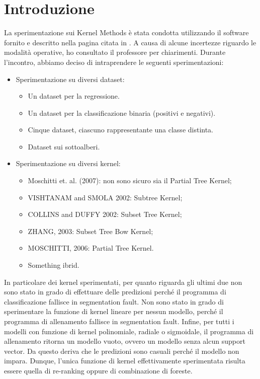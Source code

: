\section{Introduzione}

La sperimentazione sui Kernel Methods è stata condotta utilizzando il software 
fornito e descritto nella pagina citata in \cite{kernel}. A causa di alcune 
incertezze riguardo le modalità operative, ho consultato il professore per 
chiarimenti. Durante l'incontro, abbiamo deciso di intraprendere le seguenti 
sperimentazioni:

\begin{itemize}
    \item Sperimentazione su diversi dataset:
    \begin{itemize}
        \item Un dataset per la regressione.
        \item Un dataset per la classificazione binaria (positivi e negativi).
        \item Cinque dataset, ciascuno rappresentante una classe distinta.
        \item Dataset sui sottoalberi.
    \end{itemize}
\item Sperimentazione su diversi kernel:
    \begin{itemize}
        \item Moschitti et. al. (2007): non sono sicuro sia il Partial Tree
            Kernel;

        \item VISHTANAM and SMOLA 2002: Subtree Kernel;

        \item COLLINS and DUFFY 2002: Subset Tree Kernel;

        \item ZHANG, 2003: Subset Tree Bow Kernel;

        \item MOSCHITTI, 2006: Partial Tree Kernel.

        \item Something ibrid.
    \end{itemize}
\end{itemize}

In particolare dei kernel sperimentati, per quanto riguarda gli ultimi due non 
sono stato in grado di effettuare delle predizioni perché il programma di 
classificazione fallisce in segmentation fault. 
Non sono stato in grado di sperimentare la funzione
di kernel lineare per nessun modello, perché il programma di allenamento
fallisce in segmentation fault. Infine, per tutti i modelli con funzione di
kernel polinomiale, radiale o sigmoidale, il programma di allenamento ritorna un
modello vuoto, ovvero un modello senza alcun support vector. Da questo
deriva che le predizioni sono casuali perché il modello non impara. Dunque,
l'unica funzione di kernel effettivamente sperimentata risulta essere quella di
re-ranking oppure di combinazione di foreste.
